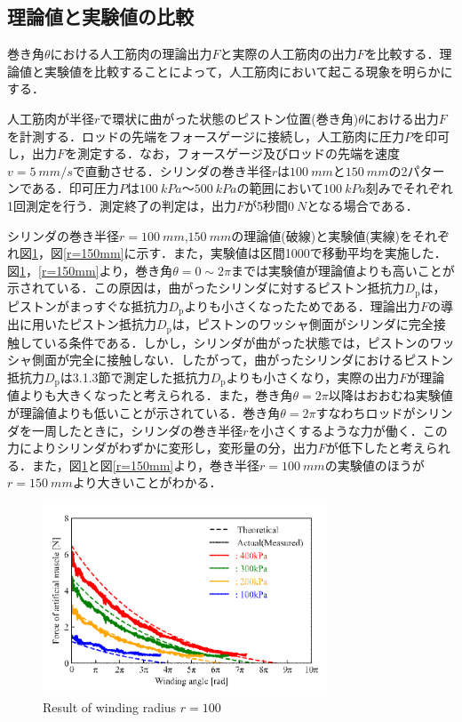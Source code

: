 \subsection{理論値と実験値の比較}%
巻き角$\theta$における人工筋肉の理論出力$F$と実際の人工筋肉の出力$F$を比較する．理論値と実験値を比較することによって，人工筋肉において起こる現象を明らかにする．
\par
人工筋肉が半径$r$で環状に曲がった状態のピストン位置(巻き角)$θ$における出力$F$を計測する．ロッドの先端をフォースゲージに接続し，人工筋肉に圧力$P$を印可し，出力$F$を測定する．なお，フォースゲージ及びロッドの先端を速度$v=\SI{5}{mm/s}$で直動させる．シリンダの巻き半径$r$は$\SI{100}{mm}$と$\SI{150}{mm}$の2パターンである．印可圧力$P$は$\SI{100}{kPa}～\SI{500}{kPa}$の範囲において$\SI{100}{kPa}$刻みでそれぞれ1回測定を行う．測定終了の判定は，出力$F$が5秒間$\SI{0}{N}$となる場合である．
\par
シリンダの巻き半径$r=\SI{100}{mm}$,$\SI{150}{mm}$の理論値(破線)と実験値(実線)をそれぞれ図\ref{r=100mm}，図\ref{r=150mm}に示す．また，実験値は区間1000で移動平均を実施した．図\ref{r=100mm}，\ref{r=150mm}より，巻き角$\theta=0 \sim 2\pi$までは実験値が理論値よりも高いことが示されている．この原因は，曲がったシリンダに対するピストン抵抗力$D_\mathrm{p}$は，ピストンがまっすぐな抵抗力$D_\mathrm{p}$よりも小さくなったためである．理論出力$F$の導出に用いたピストン抵抗力$D_\mathrm{p}$は，ピストンのワッシャ側面がシリンダに完全接触している条件である．しかし，シリンダが曲がった状態では，ピストンのワッシャ側面が完全に接触しない．したがって，曲がったシリンダにおけるピストン抵抗力$D_\mathrm{p}$は3.1.3節で測定した抵抗力$D_\mathrm{p}$よりも小さくなり，実際の出力$F$が理論値よりも大きくなったと考えられる．また，巻き角$\theta=2\pi$以降はおおむね実験値が理論値よりも低いことが示されている．巻き角$\theta=2\pi$すなわちロッドがシリンダを一周したときに，シリンダの巻き半径$r$を小さくするような力が働く．この力によりシリンダがわずかに変形し，変形量の分，出力$F$が低下したと考えられる．また，図\ref{r=100mm}と図\ref{r=150mm}より，巻き半径$r=\SI{100}{mm}$の実験値のほうが$r=\SI{150}{mm}$より大きいことがわかる．
\begin{figure}[t]
  \centering
  \includegraphics[width=85mm]{_pdf/result_100mm.pdf}
  \caption{Result of winding radius $r=100$}
  \label{r=100mm}
\end{figure}

